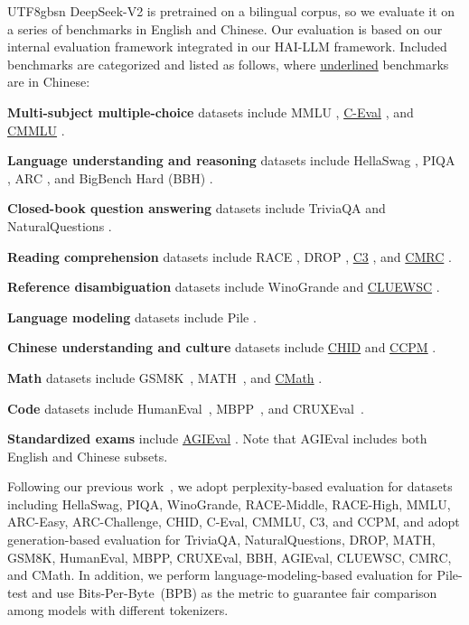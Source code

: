 \documentclass[11pt, a4paper, logo, copyright, nonumbering]{deepseek}
\newcommand{\dsvii}{DeepSeek-V2}
\begin{document}
\begin{CJK*}{UTF8}{gbsn}
\dsvii{} is pretrained on a bilingual corpus, so we evaluate it on a series of benchmarks in English and Chinese.
Our evaluation is based on our internal evaluation framework integrated in our HAI-LLM framework. 
Included benchmarks are categorized and listed as follows, where \underline{underlined} benchmarks are in Chinese:

\textbf{Multi-subject multiple-choice} datasets include MMLU \citep{mmlu}, \underline{C-Eval} \citep{ceval}, and \underline{CMMLU} \citep{cmmlu}.

\textbf{Language understanding and reasoning} datasets include HellaSwag \citep{hellaswag}, PIQA \citep{piqa}, ARC \citep{arc}, and BigBench Hard (BBH) \citep{bbh}.

\textbf{Closed-book question answering} datasets include TriviaQA \citep{joshi-etal-2017-triviaqa} and NaturalQuestions \citep{naturalquestions}.

\textbf{Reading comprehension} datasets include RACE \cite{race}, DROP \citep{drop}, \underline{C3} \citep{sun2019investigating}, and \underline{CMRC} \citep{cui-etal-2019-span}.

\textbf{Reference disambiguation} datasets include WinoGrande \cite{sakaguchi2019winogrande} and \underline{CLUEWSC} \citep{clue}.

\textbf{Language modeling} datasets include Pile \citep{pile}.

\textbf{Chinese understanding and culture} datasets include \underline{CHID} \citep{chid} and \underline{CCPM} \citep{li2021ccpm}.

\textbf{Math} datasets include GSM8K~\citep{gsm8k}, MATH~\citep{hendrycks2021measuring}, and \underline{CMath} \citep{wei2023cmath}.

\textbf{Code} datasets include HumanEval~\citep{codex}, MBPP~\citep{mbpp}, and CRUXEval~\citep{gu2024cruxeval}.

\textbf{Standardized exams} include \underline{AGIEval} \citep{agieval}. 
Note that AGIEval includes both English and Chinese subsets.

Following our previous work~\citep{deepseek1}, we adopt perplexity-based evaluation for datasets including HellaSwag, PIQA, WinoGrande, RACE-Middle, RACE-High, MMLU, ARC-Easy, ARC-Challenge, CHID, C-Eval, CMMLU, C3, and CCPM, and adopt generation-based evaluation for TriviaQA, NaturalQuestions, DROP, MATH, GSM8K, HumanEval, MBPP, CRUXEval, BBH, AGIEval, CLUEWSC, CMRC, and CMath. 
In addition, we perform language-modeling-based evaluation for Pile-test and use Bits-Per-Byte~(BPB) as the metric to guarantee fair comparison among models with different tokenizers. 


\end{CJK*}
\end{document}
